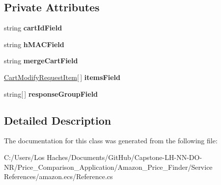 \subsection*{Private Attributes}
\begin{DoxyCompactItemize}
\item 
\hypertarget{class_price___comparison_1_1amazon_1_1ecs_1_1_cart_modify_request_a9ddadc8259903ba7e93bf08508325751}{string {\bfseries cart\-Id\-Field}}\label{class_price___comparison_1_1amazon_1_1ecs_1_1_cart_modify_request_a9ddadc8259903ba7e93bf08508325751}

\item 
\hypertarget{class_price___comparison_1_1amazon_1_1ecs_1_1_cart_modify_request_a1e0a95ea49875fd9170f2f15b0c247ca}{string {\bfseries h\-M\-A\-C\-Field}}\label{class_price___comparison_1_1amazon_1_1ecs_1_1_cart_modify_request_a1e0a95ea49875fd9170f2f15b0c247ca}

\item 
\hypertarget{class_price___comparison_1_1amazon_1_1ecs_1_1_cart_modify_request_a5e60da3e73a4f395299e3365799cb3d7}{string {\bfseries merge\-Cart\-Field}}\label{class_price___comparison_1_1amazon_1_1ecs_1_1_cart_modify_request_a5e60da3e73a4f395299e3365799cb3d7}

\item 
\hypertarget{class_price___comparison_1_1amazon_1_1ecs_1_1_cart_modify_request_aedcf7aab86a063e588586e444e7b7bc3}{\hyperlink{class_price___comparison_1_1amazon_1_1ecs_1_1_cart_modify_request_item}{Cart\-Modify\-Request\-Item}\mbox{[}$\,$\mbox{]} {\bfseries items\-Field}}\label{class_price___comparison_1_1amazon_1_1ecs_1_1_cart_modify_request_aedcf7aab86a063e588586e444e7b7bc3}

\item 
\hypertarget{class_price___comparison_1_1amazon_1_1ecs_1_1_cart_modify_request_a36f426eed5aed5acf745ebe9e5052904}{string\mbox{[}$\,$\mbox{]} {\bfseries response\-Group\-Field}}\label{class_price___comparison_1_1amazon_1_1ecs_1_1_cart_modify_request_a36f426eed5aed5acf745ebe9e5052904}

\end{DoxyCompactItemize}


\subsection{Detailed Description}


The documentation for this class was generated from the following file\-:\begin{DoxyCompactItemize}
\item 
C\-:/\-Users/\-Los Haches/\-Documents/\-Git\-Hub/\-Capstone-\/\-L\-H-\/\-N\-N-\/\-D\-O-\/\-N\-R/\-Price\-\_\-\-Comparison\-\_\-\-Application/\-Amazon\-\_\-\-Price\-\_\-\-Finder/\-Service References/amazon.\-ecs/Reference.\-cs\end{DoxyCompactItemize}
